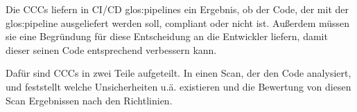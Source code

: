 \documentclass[../main.tex]{subfiles}
\begin{document}
Die \glspl{CCC} liefern in \gls{CI/CD} \glspl{glos:pipeline} ein Ergebnis, ob der Code, der mit der \gls{glos:pipeline} ausgeliefert werden soll, compliant oder nicht ist.
Außerdem müssen sie eine Begründung für diese Entscheidung an die Entwickler liefern, damit dieser seinen Code entsprechend verbessern kann.

Dafür sind \glspl{CCC} in zwei Teile aufgeteilt. 
In einen Scan, der den Code analysiert, und feststellt welche Unsicherheiten u.\"a. existieren und die Bewertung von diesen Scan Ergebnissen nach den Richtlinien.
\end{document}
